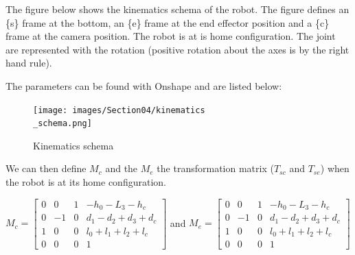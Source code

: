 \bigbreak
The figure below shows the kinematics schema of the robot. The figure defines an \{s\} frame at the bottom, an \{e\} frame at the end effector position and a \{c\} frame at the camera position. The robot is at is home configuration. The joint are represented with the rotation (positive rotation about the axes is by the right hand rule).

\bigbreak 
The parameters can be found with Onshape and are listed below: 

\begin{center}
\end{center}

\begin{figure}[ht]
    \centering
    \texttt{[image: images/Section04/kinematics\\\_schema.png]}
    \caption{Kinematics schema}
    \label{fig:mesh10}
\end{figure}
\FloatBarrier

\bigbreak
We can then define $M_c$ and the $M_e$ the transformation matrix ($T_{sc}$ and $T_{se}$) when the robot is at its home configuration. 

\bigbreak
\begin{center}
    $
    M_c = \begin{bmatrix}
        0 & 0 & 1 & -h_0-L_3-h_c\\
        0 & -1 & 0 & d_1-d_2+d_3+d_c\\
        1 & 0 & 0 & l_0+l_1+l_2+l_c\\
        0 & 0 & 0 & 1
    \end{bmatrix}
    $
    and
    $
    M_e = \begin{bmatrix}
        0 & 0 & 1 & -h_0-L_3-h_c\\
        0 & -1 & 0 & d_1-d_2+d_3+d_c\\
        1 & 0 & 0 & l_0+l_1+l_2+l_c\\
        0 & 0 & 0 & 1
    \end{bmatrix}
    $
\end{center}

